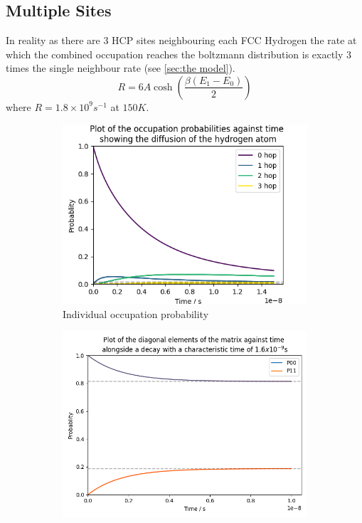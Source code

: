 \subsection{Multiple Sites}
In reality as there are 3 HCP sites neighbouring
each FCC Hydrogen the rate at which the
combined
occupation reaches the
boltzmann distribution
is exactly \(3\)
times the single neighbour rate
(see \cref{sec:the model}).
\begin{equation}
    R = 6A\cosh{(\frac{\beta (E_1 - E_0)}{2})}
\end{equation}
where \(R=1.8\times{}10^{9}s^{-1}\) at
\(150K\).
\begin{figure}[htbp]
    \centering
    \begin{subfigure}{0.45\linewidth}
        \centering
        \includegraphics[width =0.9 \linewidth]{Figures/Redfield/Plot of Lindblad solution many sites.png}
        \caption{Individual occupation probability
        }\label{sub@fig:multi site Lindblad}
    \end{subfigure}
    \hfill
    \begin{subfigure}{0.45\linewidth}
        \centering
        \includegraphics[width = 0.9\linewidth]{Figures/Redfield/Plot of redfield solution long time.png}

\end{subfigure}
\end{figure}
